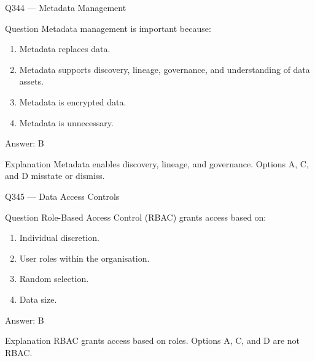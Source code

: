 \documentclass[aspectratio=169,8pt]{beamer}
\begin{document}
\begin{frame}{Q344 --- Metadata Management}
	\begin{block}{Question}
		Metadata management is important because:
		\begin{enumerate}
			\item Metadata replaces data.
			\item Metadata supports discovery, lineage, governance, and understanding of data assets.
			\item Metadata is encrypted data.
			\item Metadata is unnecessary.
	\end{enumerate}  \end{block}
	\begin{exampleblock}{Answer: B}\end{exampleblock}
	\begin{block}{Explanation}
		Metadata enables discovery, lineage, and governance. Options A, C, and D misstate or dismiss.
	\end{block}
\end{frame}

\begin{frame}{Q345 --- Data Access Controls}
	\begin{block}{Question}
		Role-Based Access Control (RBAC) grants access based on:
		\begin{enumerate}
			\item Individual discretion.
			\item User roles within the organisation.
			\item Random selection.
			\item Data size.
	\end{enumerate}  \end{block}
	\begin{exampleblock}{Answer: B}\end{exampleblock}
	\begin{block}{Explanation}
		RBAC grants access based on roles. Options A, C, and D are not RBAC.
	\end{block}
\end{frame}
\end{document}
